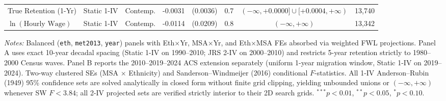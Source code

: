 \begin{table}[t!]
\begin{tabular}{lllccccc}
True Retention (1-Yr) & Static 1-IV & Contemp. & -0.0031 & (0.0036) & 0.7 & $(-\infty, +0.0000] \cup [+0.0004, +\infty)$ & 13,740 \\
$\ln(\text{Hourly Wage})$ & Static 1-IV & Contemp. & -0.0114 & (0.0209) & 0.8 & $(-\infty, +\infty)$ & 13,342 \\
\bottomrule
\end{tabular}
\begin{minipage}{0.98\linewidth}
\footnotesize\textit{Notes:} Balanced (\texttt{eth}, \texttt{met2013}, \texttt{year}) panels with Eth$\times$Yr, MSA$\times$Yr, and Eth$\times$MSA FEs absorbed via weighted FWL projections. Panel A uses exact 10-year decadal spacing (Static 1-IV on 1990--2010; JRS 2-IV on 2000--2010) and restricts 5-year retention strictly to 1980--2000 Census waves. Panel B reports the 2010--2019--2024 ACS extension separately (uniform 1-year migration window, Static 1-IV on 2019--2024). Two-way clustered SEs (MSA $\times$ Ethnicity) and Sanderson--Windmeijer (2016) conditional $F$-statistics. All 1-IV Anderson--Rubin (1949) 95\% confidence sets are solved analytically in closed form without finite grid clipping, yielding unbounded unions or $(-\infty, +\infty)$ whenever SW $F < 3.84$; all 2-IV projected sets are verified strictly interior to their 2D search grids. $^{***}p<0.01$, $^{**}p<0.05$, $^{*}p<0.10$.
\end{minipage}
\end{table}
